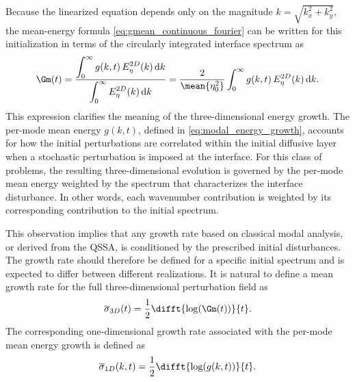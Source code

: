 Because the linearized equation depends only on the magnitude \(k=\sqrt{k_x^2+k_y^2}\), the mean-energy formula \eqref{eq:gmean_continuous_fourier} can be written for this initialization in terms of the circularly integrated interface spectrum as
\begin{equation}
    \Gm(t)
    =
    \frac{
      \displaystyle
      \int_0^\infty
      g(k,t)\,
      E_{\eta}^{2D}(k)\,
      \mathrm{d}k
    }{
      \displaystyle
      \int_0^\infty
      E_{\eta}^{2D}(k)\,
      \mathrm{d}k
    } =
    \frac{2}{\mean{\eta_0^2}}
    \int_0^\infty
      g(k,t)\,
      E_{\eta}^{2D}(k)\,
      \mathrm{d}k.
    \label{eq:gmean_eta_spectrum}
\end{equation}
This expression clarifies the meaning of the three-dimensional energy growth. The per-mode mean energy \(g(k,t)\), defined in \eqref{eq:modal_energy_growth}, accounts for how the initial perturbations are correlated within the initial diffusive layer when a stochastic perturbation is imposed at the interface. For this class of problems, the resulting three-dimensional evolution is governed by the per-mode mean energy weighted by the spectrum that characterizes the interface disturbance. In other words, each wavenumber contribution is weighted by its corresponding contribution to the initial spectrum.

This observation implies that any growth rate based on classical modal analysis, or derived from the QSSA, is conditioned by the prescribed initial disturbances. The growth rate should therefore be defined for a specific initial spectrum and is expected to differ between different realizations. It is natural to define a mean growth rate for the full three-dimensional perturbation field as
\begin{equation}
    \label{eq:sigma_3d}
    \overline{\sigma}_{3D}(t)
    =
    \frac{1}{2}
    \difft{
        \log\!\left(\Gm(t)\right)
    }{t}.
\end{equation}
The corresponding one-dimensional growth rate associated with the per-mode mean energy growth is defined as
\begin{equation}
    \label{eq:sigma_1d}
    \overline{\sigma}_{1D}(k,t)
    =
    \frac{1}{2}
    \difft{
        \log\!\left(g(k,t)\right)
    }{t}.
\end{equation}

